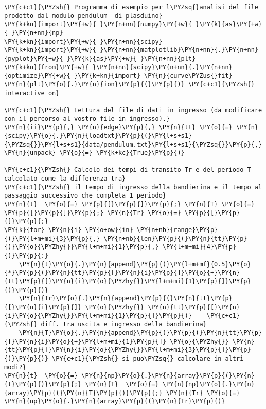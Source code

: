 \begin{Verbatim}[label=\makebox{\href{https://github.com/unipi-physics-labs/lab1-sheets/tree/main/snippy/plasduino_pendulum.py}{https://github.com/.../plasduino\_pendulum.py}},commandchars=\\\{\}]
\PY{c+c1}{\PYZsh{} Programma di esempio per l\PYZsq{}analisi del file prodotto dal modulo pendulum  di plasduino}
\PY{k+kn}{import}\PY{+w}{ }\PY{n+nn}{numpy}\PY{+w}{ }\PY{k}{as}\PY{+w}{ }\PY{n+nn}{np}
\PY{k+kn}{import}\PY{+w}{ }\PY{n+nn}{scipy}
\PY{k+kn}{import}\PY{+w}{ }\PY{n+nn}{matplotlib}\PY{n+nn}{.}\PY{n+nn}{pyplot}\PY{+w}{ }\PY{k}{as}\PY{+w}{ }\PY{n+nn}{plt}
\PY{k+kn}{from}\PY{+w}{ }\PY{n+nn}{scipy}\PY{n+nn}{.}\PY{n+nn}{optimize}\PY{+w}{ }\PY{k+kn}{import} \PY{n}{curve\PYZus{}fit}
\PY{n}{plt}\PY{o}{.}\PY{n}{ion}\PY{p}{(}\PY{p}{)} \PY{c+c1}{\PYZsh{} interactive on}

\PY{c+c1}{\PYZsh{} Lettura del file di dati in ingresso (da modificare con il percorso al vostro file in ingresso).}
\PY{n}{ii}\PY{p}{,} \PY{n}{edge}\PY{p}{,} \PY{n}{tt} \PY{o}{=} \PY{n}{scipy}\PY{o}{.}\PY{n}{loadtxt}\PY{p}{(}\PY{l+s+s1}{\PYZsq{}}\PY{l+s+s1}{data/pendulum.txt}\PY{l+s+s1}{\PYZsq{}}\PY{p}{,} \PY{n}{unpack} \PY{o}{=} \PY{k+kc}{True}\PY{p}{)}

\PY{c+c1}{\PYZsh{} Calcolo dei tempi di transito Tr e del periodo T calcolato come la differenza tra}
\PY{c+c1}{\PYZsh{} il tempo di ingresso della bandierina e il tempo al passaggio successivo che completa 1 periodo}
\PY{n}{t}  \PY{o}{=} \PY{p}{[}\PY{p}{]}\PY{p}{;} \PY{n}{T} \PY{o}{=} \PY{p}{[}\PY{p}{]}\PY{p}{;} \PY{n}{Tr} \PY{o}{=} \PY{p}{[}\PY{p}{]}\PY{p}{;}
\PY{k}{for} \PY{n}{i} \PY{o+ow}{in} \PY{n+nb}{range}\PY{p}{(}\PY{l+m+mi}{3}\PY{p}{,} \PY{n+nb}{len}\PY{p}{(}\PY{n}{tt}\PY{p}{)}\PY{o}{\PYZhy{}}\PY{l+m+mi}{1}\PY{p}{,} \PY{l+m+mi}{4}\PY{p}{)}\PY{p}{:}
    \PY{n}{t}\PY{o}{.}\PY{n}{append}\PY{p}{(}\PY{l+m+mf}{0.5}\PY{o}{*}\PY{p}{(}\PY{n}{tt}\PY{p}{[}\PY{n}{i}\PY{p}{]}\PY{o}{+}\PY{n}{tt}\PY{p}{[}\PY{n}{i}\PY{o}{\PYZhy{}}\PY{l+m+mi}{1}\PY{p}{]}\PY{p}{)}\PY{p}{)}
    \PY{n}{Tr}\PY{o}{.}\PY{n}{append}\PY{p}{(}\PY{n}{tt}\PY{p}{[}\PY{n}{i}\PY{p}{]} \PY{o}{\PYZhy{}} \PY{n}{tt}\PY{p}{[}\PY{n}{i}\PY{o}{\PYZhy{}}\PY{l+m+mi}{1}\PY{p}{]}\PY{p}{)}    \PY{c+c1}{\PYZsh{} diff. tra uscita e ingresso della bandierina}
    \PY{n}{T}\PY{o}{.}\PY{n}{append}\PY{p}{(}\PY{p}{(}\PY{n}{tt}\PY{p}{[}\PY{n}{i}\PY{o}{+}\PY{l+m+mi}{1}\PY{p}{]} \PY{o}{\PYZhy{}} \PY{n}{tt}\PY{p}{[}\PY{n}{i}\PY{o}{\PYZhy{}}\PY{l+m+mi}{3}\PY{p}{]}\PY{p}{)}\PY{p}{)} \PY{c+c1}{\PYZsh{} si puo\PYZsq{} calcolare in altri modi?}
\PY{n}{t}  \PY{o}{=} \PY{n}{np}\PY{o}{.}\PY{n}{array}\PY{p}{(}\PY{n}{t}\PY{p}{)}\PY{p}{;} \PY{n}{T}  \PY{o}{=} \PY{n}{np}\PY{o}{.}\PY{n}{array}\PY{p}{(}\PY{n}{T}\PY{p}{)}\PY{p}{;} \PY{n}{Tr} \PY{o}{=} \PY{n}{np}\PY{o}{.}\PY{n}{array}\PY{p}{(}\PY{n}{Tr}\PY{p}{)}


\end{Verbatim}

